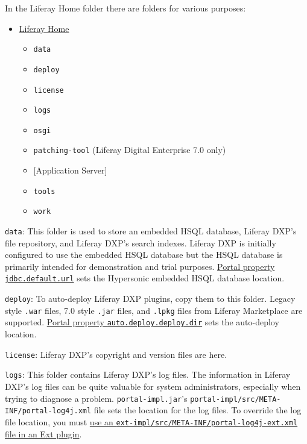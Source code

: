 In the Liferay Home folder there are folders for various purposes:

\begin{itemize}
\tightlist
\item
  \hyperref[liferay-home]{Liferay Home}

  \begin{itemize}
  \tightlist
  \item
    \texttt{data}
  \item
    \texttt{deploy}
  \item
    \texttt{license}
  \item
    \texttt{logs}
  \item
    \texttt{osgi}
  \item
    \texttt{patching-tool} (Liferay Digital Enterprise 7.0 only)
  \item
    {[}Application Server{]}
  \item
    \texttt{tools}
  \item
    \texttt{work}
  \end{itemize}
\end{itemize}

\texttt{data}: This folder is used to store an embedded HSQL database,
Liferay DXP's file repository, and Liferay DXP's search indexes.
Liferay DXP is initially configured to use the embedded HSQL database but
the HSQL database is primarily intended for demonstration and trial
purposes.
\href{@platform-ref@/7.0-latest/propertiesdoc/portal.properties.html\#JDBC}{Portal
property \texttt{jdbc.default.url}} sets the Hypersonic embedded HSQL
database location.

\texttt{deploy}: To auto-deploy Liferay DXP plugins, copy them to this
folder. Legacy style \texttt{.war} files, 7.0 style \texttt{.jar} files,
and \texttt{.lpkg} files from Liferay Marketplace are supported.
\href{@platform-ref@/7.0-latest/propertiesdoc/portal.properties.html\#Auto\%20Deploy}{Portal
property \texttt{auto.deploy.deploy.dir}} sets the auto-deploy location.

\texttt{license}: Liferay DXP's copyright and version files are here.

\texttt{logs}: This folder contains Liferay DXP's log files. The
information in Liferay DXP's log files can be quite valuable for system
administrators, especially when trying to diagnose a problem.
\texttt{portal-impl.jar}'s
\texttt{portal-impl/src/META-INF/portal-log4j.xml} file sets the
location for the log files. To override the log file location, you must
\href{/docs/7-0/tutorials/-/knowledge_base/t/advanced-customization-with-ext-plugins\#using-advanced-configuration-files}{use
an \texttt{ext-impl/src/META-INF/portal-log4j-ext.xml} file in an Ext
plugin}.

